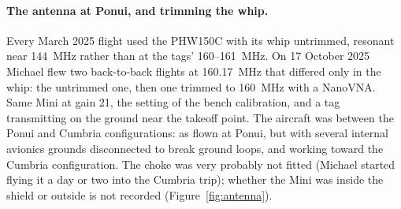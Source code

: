 \documentclass[11pt]{article}
\begin{document}
\paragraph{The antenna at Ponui, and trimming the whip.}
\label{sec:antenna}
Every March 2025 flight used the PHW150C with its whip untrimmed, resonant near 144~MHz rather than
at the tags' 160--161~MHz. On 17 October 2025 Michael flew two back-to-back flights at 160.17~MHz that
differed only in the whip: the untrimmed one, then one trimmed to 160~MHz with a NanoVNA. Same Mini at
gain 21, the setting of the bench calibration, and a tag transmitting on the ground near the takeoff
point. The aircraft was between the Ponui and Cumbria configurations: as flown at Ponui, but with
several internal avionics grounds disconnected to break ground loops, and working toward the Cumbria
configuration. The choke was very probably not fitted (Michael started flying it a day or two into
the Cumbria trip); whether the Mini was inside the shield or outside is not recorded
(Figure~\ref{fig:antenna}).
\end{document}
